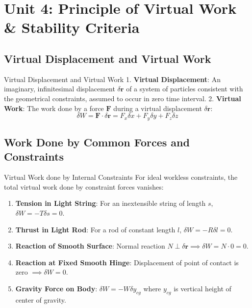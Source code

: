 \documentclass[11pt,a4paper]{article}
\begin{document}
\section{Unit 4: Principle of Virtual Work \& Stability Criteria}

\subsection{Virtual Displacement and Virtual Work}

\begin{definitionbox}{Virtual Displacement and Virtual Work}
1. \textbf{Virtual Displacement}: An imaginary, infinitesimal displacement $\delta \mathbf{r}$ of a system of particles consistent with the geometrical constraints, assumed to occur in zero time interval.
2. \textbf{Virtual Work}: The work done by a force $\mathbf{F}$ during a virtual displacement $\delta \mathbf{r}$:
\begin{equation}
\delta W = \mathbf{F} \cdot \delta \mathbf{r} = F_x \delta x + F_y \delta y + F_z \delta z
\end{equation}
\end{definitionbox}

\subsection{Work Done by Common Forces and Constraints}

\begin{theorembox}{Virtual Work done by Internal Constraints}
For ideal workless constraints, the total virtual work done by constraint forces vanishes:
\begin{enumerate}
    \item \textbf{Tension in Light String}: For an inextensible string of length $s$, $\delta W = -T \delta s = 0$.
    \item \textbf{Thrust in Light Rod}: For a rod of constant length $l$, $\delta W = -R \delta l = 0$.
    \item \textbf{Reaction of Smooth Surface}: Normal reaction $N \perp \delta \mathbf{r} \implies \delta W = N \cdot 0 = 0$.
    \item \textbf{Reaction at Fixed Smooth Hinge}: Displacement of point of contact is zero $\implies \delta W = 0$.
    \item \textbf{Gravity Force on Body}: $\delta W = -W \delta y_{cg}$ where $y_{cg}$ is vertical height of center of gravity.
\end{enumerate}
\end{theorembox}
\end{document}

